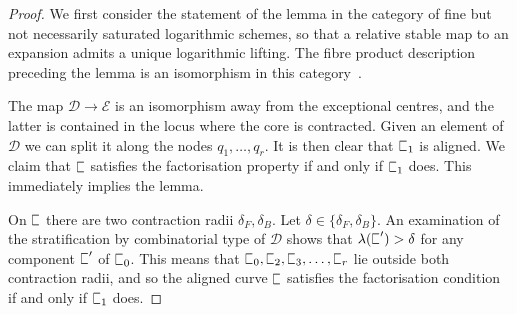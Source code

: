 \documentclass[11pt]{amsart}
\newcommand{\sqC}{\scalebox{0.8}[1.3]{$\sqsubset$}}
\newcommand{\PP}{\mathbb P}
\renewcommand{\to}{\rightarrow}
\newcommand{\Dcal}{\mathcal{D}}
\newcommand{\Ecal}{\mathcal{E}}
\theoremstyle{definition}
\newtheorem{lemma}[thm]{Lemma}
\theoremstyle{definition}
\begin{document}
\begin{proof}
We first consider the statement of the lemma in the category of fine but not necessarily saturated logarithmic schemes, so that a relative stable map to an expansion admits a unique logarithmic lifting. The fibre product description preceding the lemma is an isomorphism in this category~\cite[Lemma~4.2.2]{AbramovichMarcusWiseComparison}.

The map $\Dcal\to\Ecal$ is an isomorphism away from the exceptional centres, and the latter is contained in the locus where the core is contracted. Given an element of $\Dcal$ we can split it along the nodes $q_1,\ldots,q_r$. It is then clear that $\sqC_1$ is aligned. We claim that $\sqC$ satisfies the factorisation property if and only if $\sqC_1$ does. This immediately implies the lemma.

On $\sqC$ there are two contraction radii $\delta_F,\delta_B$. Let $\delta \in \{\delta_F,\delta_B\}$. An examination of the stratification by combinatorial type of $\Dcal$ shows that $\lambda(\sqC^\prime) > \delta$ for any component $\sqC^\prime$ of $\sqC_0$. This means that $\sqC_0,\sqC_2,\sqC_3,\ldots,\sqC_r$ lie outside both contraction radii, and so the aligned curve $\sqC$ satisfies the factorisation condition if and only if $\sqC_1$ does. \end{proof}

%
\end{document}

